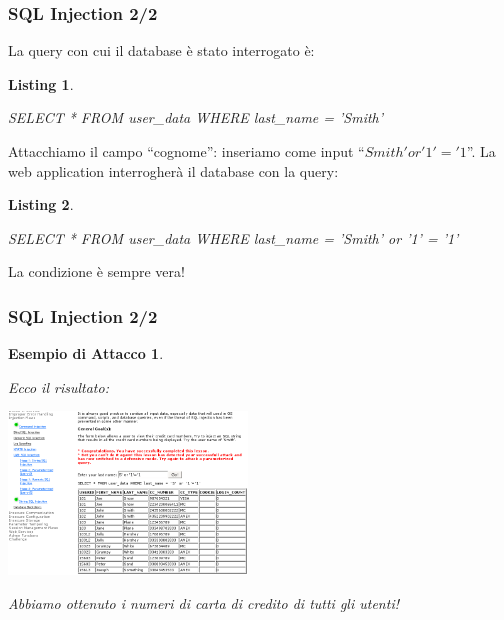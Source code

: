 \documentclass{beamer}
\newtheorem{myexample}{Esempio di Attacco}
\newtheorem{codice}{Listing}
\begin{document}
\begin{frame}[fragile]
  \frametitle{SQL Injection 2/2}
  \begin{tiny}
    La query con cui il database \`e stato interrogato \`e:
    \begin{codice}
      \begin{semiverbatim}
	SELECT * FROM user_data 
                 WHERE last_name = 'Smith'
      \end{semiverbatim}
    \end{codice}
    \pause
    Attacchiamo il campo ``cognome'': inseriamo come input ``{\it $Smith' or '1' = '1$}''. La web application interrogher\`a il database con la query:
    \begin{codice}
      \begin{semiverbatim}
	SELECT * FROM user\_data 
                 WHERE last\_name = 'Smith'
                 \alert{or '1' = '1'}
      \end{semiverbatim}
    \end{codice}
    \pause
    \alert{La condizione \`e sempre vera!} \newline
  \end{tiny}
\end{frame}

\begin{frame}
  \frametitle{SQL Injection 2/2}
  \begin{myexample}
    \begin{tiny}
      Ecco il risultato:
      \begin{center}
	\includegraphics[width=180pt]{images/sql_injection_2.png}
      \end{center}
      \alert{Abbiamo ottenuto i numeri di carta di credito di tutti gli utenti!}
    \end{tiny}
  \end{myexample}
\end{frame}
\end{document}
